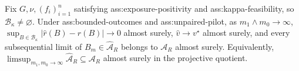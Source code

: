 Fix \(G,\nu,(f_i)_{i=1}^n\) satisfying ass:exposure-positivity and ass:kappa-feasibility, so \(\mathcal B_\kappa\neq\varnothing\). Under ass:bounded-outcomes and ass:unpaired-pilot, as \(m_1\wedge m_0\to\infty\), \(\sup_{B\in\mathcal B_\kappa}|\widehat r(B)-r(B)|\to0\) almost surely, \(\widehat v\to v^\star\) almost surely, and every subsequential limit of \(B_m\in\widehat{\mathcal A}_R\) belongs to \(\mathcal A_R\) almost surely. Equivalently, \(\limsup_{m_1,m_0\to\infty}\widehat{\mathcal A}_R\subseteq\mathcal A_R\) almost surely in the projective quotient.
